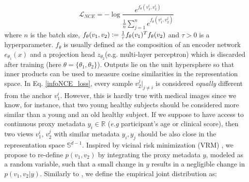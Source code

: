 \documentclass[runningheads]{llncs}
\newcommand{\defeq}{\vcentcolon=}
\begin{document}

\begin{equation}
    \label{infoNCE_loss}
    \mathcal{L}_{NCE} = -\log \frac{e^{f_\theta(v_1^i, v_2^i)}}{\frac{1}{n}\sum_{j=1}^n e^{f_\theta(v_1^i, v_2^j)}}
\end{equation}
where $n$ is the batch size, $f_\theta(v_1, v_2) \defeq \frac{1}{\tau}f_\theta(v_1)^Tf_\theta(v_2)$ and $\tau > 0$ is a hyperparameter. $f_\theta$ is usually defined as the composition of an encoder network $e_{\theta_1}(x)$ and a projection head $z_{\theta_2}$(e.g. multi-layer perceptron) which is discarded after training (here $\theta=\{\theta_1, \theta_2\}$). Outputs lie on the unit hypersphere so that inner products can be used to measure cosine similarities in the representation space.  
In Eq. \ref{infoNCE_loss}, every sample $v_2^j|_{j\neq i}$ is considered \textit{equally} different from the anchor $v_1^i$. However, this is hardly true with medical images since we know, for instance, that two young healthy subjects should be considered more similar than a young and an old healthy subject. If we suppose to have access to continuous proxy metadata $y_i \in \mathbb{R}$ (\textit{e.g} participant's age or clinical score), then two views $v_1^i$, $v_2^j$ with similar metadata $y_i, y_j$ should be also close in the representation space $\mathbb{S}^{d-1}$. Inspired by vicinal risk minimization (VRM) \cite{chapelle2001vicinal}, we propose to re-define $p(v_1, v_2)$ by integrating the proxy metadata $y$, modeled as a random variable, such that a small change in $y$ results in a negligible change in $p(v_1, v_2 | y)$. Similarly to \cite{ding2020ccgan}, we define the empirical joint distribution as:




\end{document}
